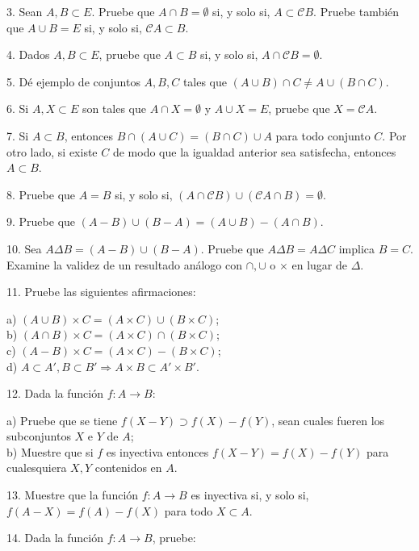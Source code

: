 \documentclass[12pt,oneside]{book}
\begin{document}
3. Sean \( A, B \subset E \). Pruebe que \( A \cap B = \emptyset \) si, y solo si, \( A \subset \mathcal{C}B \). Pruebe también que \( A \cup B = E \) si, y solo si, \( \mathcal{C}A \subset B \).

4. Dados \( A, B \subset E \), pruebe que \( A \subset B \) si, y solo si, \( A \cap \mathcal{C}B = \emptyset \).

5. Dé ejemplo de conjuntos \( A, B, C \) tales que \( (A \cup B) \cap C \neq A \cup (B \cap C) \).

6. Si \( A, X \subset E \) son tales que \( A \cap X = \emptyset \) y \( A \cup X = E \), pruebe que \( X = \mathcal{C}A \).

7. Si \( A \subset B \), entonces \( B \cap (A \cup C) = (B \cap C) \cup A \) para todo conjunto \( C \). Por otro lado, si existe \( C \) de modo que la igualdad anterior sea satisfecha, entonces \( A \subset B \).

8. Pruebe que \( A = B \) si, y solo si, \( (A \cap \mathcal{C}B) \cup (\mathcal{C}A \cap B) = \emptyset \).

9. Pruebe que \( (A - B) \cup (B - A) = (A \cup B) - (A \cap B) \).

10. Sea \( A \Delta B = (A - B) \cup (B - A) \). Pruebe que \( A \Delta B = A \Delta C \) implica \( B = C \). Examine la validez de un resultado análogo con \( \cap, \cup \) o \( \times \) en lugar de \( \Delta \).

11. Pruebe las siguientes afirmaciones:

a) \( (A \cup B) \times C = (A \times C) \cup (B \times C) \);\\
b) \( (A \cap B) \times C = (A \times C) \cap (B \times C) \);\\
c) \( (A - B) \times C = (A \times C) - (B \times C) \);\\
d) \( A \subset A', B \subset B' \Rightarrow A \times B \subset A' \times B' \).

12. Dada la función \( f: A \to B \):

a) Pruebe que se tiene \( f(X - Y) \supset f(X) - f(Y) \), sean cuales fueren los subconjuntos \( X \) e \( Y \) de \( A \);\\
b) Muestre que si \(f\) es inyectiva entonces \(f(X - Y) = f(X) - f(Y)\) para cualesquiera \(X, Y\) contenidos en \(A\).

13. Muestre que la función \(f: A \to B\) es inyectiva si, y solo si, \(f(A - X) = f(A) - f(X)\) para todo \(X \subset A\).

14. Dada la función \(f: A \to B\), pruebe:
\end{document}
